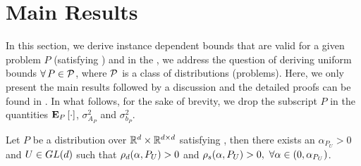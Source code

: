 \section{Main Results}\label{sec:mainresults}
In this section, we derive instance dependent bounds that are valid for a given problem $P$ (satisfying ) and in the , we address the question of deriving uniform bounds $\forall\,P\in \P$, where $\P$ is a class of distributions (problems). Here, we only present the main results followed by a discussion and the detailed proofs can be found in . In what follows, for the sake of brevity, we drop the subscript $P$ in the quantities $\EEP{\cdot}$, $\sigma^2_{A_P}$ and $\sigma^2_{b_P}$.
\begin{lemma}\label{lm:hur}
Let $P$ be a distribution over $\R^d\times \R^{\dcd}$ satisfying , then there exists an $\alpha_{P_U}>0$ and $U\in \gln$ such that $\rhod{P_U}>0$ and $\rhos{P_U}>0,~\forall \alpha \in (0,\alpha_{P_U})$.
\end{lemma}
\begin{comment}
\begin{proof}
\begin{align*}
\rhos{P}&=\inf_{x:\norm{x}=1}x^* (A_P+A_P^*)x -\alpha x^*\EE{A_t^* A_t} x\\
&=\inf_{x:\norm{x}=1}x^* (A_P+A_P^*)x -\alpha x^* A^*_P A_P -\alpha x^* \EE{M_t^* M_t} x\\
&\geq \lambda_{\min}(A^*_P+A_P)-\alpha \norm{A_P}^2-\sigma^2_P
\end{align*}
The proof is complete by choosing $\alpha_P<\frac{\lambda_{\min}(A^*_P+A_P)}{\norm{A_P}^2+\sigma^2_P}$
\end{proof}
\end{comment}



